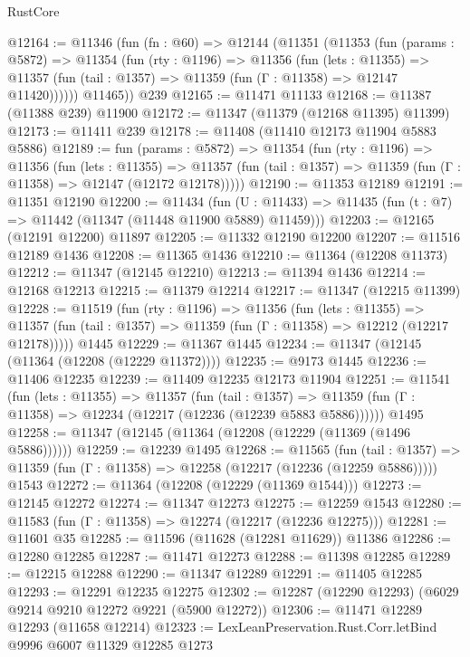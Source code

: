 \begin{lexlean}{RustCore}
\begin{coremodule}
@12164 := @11346
    (fun (fn : @60) =>
    @12144
      (@11351
        (@11353
          (fun (params : @5872) =>
          @11354
            (fun (rty : @1196) =>
            @11356
              (fun (lets : @11355) =>
              @11357 (fun (tail : @1357) => @11359 (fun (Γ : @11358) => @12147 @11420))))))
        @11465))
    @239
@12165 := @11471 @11133
@12168 := @11387 (@11388 @239) @11900
@12172 := @11347 (@11379 (@12168 @11395) @11399)
@12173 := @11411 @239
@12178 := @11408 (@11410 @12173 @11904 @5883 @5886)
@12189 := fun (params : @5872) =>
  @11354
    (fun (rty : @1196) =>
    @11356
      (fun (lets : @11355) =>
      @11357 (fun (tail : @1357) => @11359 (fun (Γ : @11358) => @12147 (@12172 @12178)))))
@12190 := @11353 @12189
@12191 := @11351 @12190
@12200 := @11434
    (fun (U : @11433) => @11435 (fun (t : @7) => @11442 (@11347 (@11448 @11900 @5889) @11459)))
@12203 := @12165 (@12191 @12200) @11897
@12205 := @11332 @12190 @12200
@12207 := @11516 @12189 @1436
@12208 := @11365 @1436
@12210 := @11364 (@12208 @11373)
@12212 := @11347 (@12145 @12210)
@12213 := @11394 @1436
@12214 := @12168 @12213
@12215 := @11379 @12214
@12217 := @11347 (@12215 @11399)
@12228 := @11519
    (fun (rty : @1196) =>
    @11356
      (fun (lets : @11355) =>
      @11357 (fun (tail : @1357) => @11359 (fun (Γ : @11358) => @12212 (@12217 @12178)))))
    @1445
@12229 := @11367 @1445
@12234 := @11347 (@12145 (@11364 (@12208 (@12229 @11372))))
@12235 := @9173 @1445
@12236 := @11406 @12235
@12239 := @11409 @12235 @12173 @11904
@12251 := @11541
    (fun (lets : @11355) =>
    @11357
      (fun (tail : @1357) =>
      @11359 (fun (Γ : @11358) => @12234 (@12217 (@12236 (@12239 @5883 @5886))))))
    @1495
@12258 := @11347 (@12145 (@11364 (@12208 (@12229 (@11369 (@1496 @5886))))))
@12259 := @12239 @1495
@12268 := @11565
    (fun (tail : @1357) => @11359 (fun (Γ : @11358) => @12258 (@12217 (@12236 (@12259 @5886)))))
    @1543
@12272 := @11364 (@12208 (@12229 (@11369 @1544)))
@12273 := @12145 @12272
@12274 := @11347 @12273
@12275 := @12259 @1543
@12280 := @11583 (fun (Γ : @11358) => @12274 (@12217 (@12236 @12275)))
@12281 := @11601 @35
@12285 := @11596 (@11628 (@12281 @11629)) @11386
@12286 := @12280 @12285
@12287 := @11471 @12273
@12288 := @11398 @12285
@12289 := @12215 @12288
@12290 := @11347 @12289
@12291 := @11405 @12285
@12293 := @12291 @12235 @12275
@12302 := @12287 (@12290 @12293) (@6029 @9214 @9210 @12272 @9221 (@5900 @12272))
@12306 := @11471 @12289 @12293 (@11658 @12214)
@12323 := LexLeanPreservation.Rust.Corr.letBind
    @9996
    @6007
    @11329
    @12285
    @1273

\end{coremodule}
\end{lexlean}
